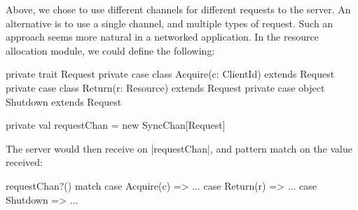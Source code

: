 Above, we chose to use different channels for different requests to the
server.  An alternative is to use a single channel, and multiple types of
request.  Such an approach seems more natural in a networked application.  In
the resource allocation module, we could define the following:
%
\begin{scala}
  private trait Request
  private case class Acquire(c: ClientId) extends Request
  private case class Return(r: Resource) extends Request
  private case object Shutdown extends Request

  private val requestChan = new SyncChan[Request]
\end{scala}
%
The server would then receive on |requestChan|, and pattern match on the value
received:
%
\begin{scala}
  requestChan?() match{
    case Acquire(c) => ...
    case Return(r) => ...
    case Shutdown => ...
  }
\end{scala}
